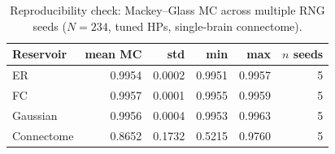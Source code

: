 \begin{table}[h]
    \centering
    \caption{Reproducibility check: Mackey--Glass MC across multiple RNG seeds ($N{=}234$, tuned HPs, single-brain connectome).}
    \label{tab:mg_multiseed}
    \begin{tabular}{lrrrrr}
        \hline
        Reservoir & mean MC & std & min & max & $n$ seeds \\
        \hline
        ER & 0.9954 & 0.0002 & 0.9951 & 0.9957 & 5 \\
        FC & 0.9957 & 0.0001 & 0.9955 & 0.9959 & 5 \\
        Gaussian & 0.9956 & 0.0004 & 0.9953 & 0.9963 & 5 \\
        Connectome & 0.8652 & 0.1732 & 0.5215 & 0.9760 & 5 \\
        \hline
    \end{tabular}
\end{table}
